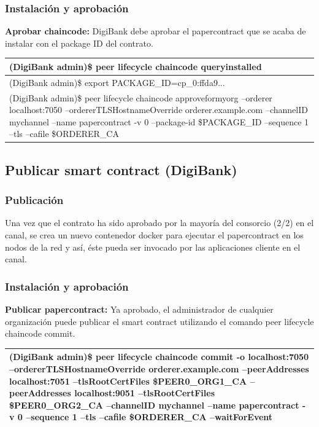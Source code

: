 \documentclass{beamer}
\begin{document}
	\begin{frame}
		\frametitle{Instalación y aprobación}
		\textbf{Aprobar chaincode:} DigiBank debe aprobar el papercontract que se acaba de instalar con el package ID del contrato.\\
		\begin{center}
			\begin{tabulary}{\linewidth}{L}
				\hline
				(DigiBank admin)\$ peer lifecycle chaincode queryinstalled \\
				\hline
				(DigiBank admin)\$ export PACKAGE\_ID=cp\_0:ffda9... \\
				\hline
				(DigiBank admin)\$ peer lifecycle chaincode approveformyorg --orderer localhost:7050 --ordererTLSHostnameOverride orderer.example.com --channelID mychannel --name papercontract -v 0 --package-id \$PACKAGE\_ID --sequence 1 --tls --cafile \$ORDERER\_CA \\
				\hline
			\end{tabulary} 
		\end{center}
	\end{frame}
	
	\subsection{Publicar smart contract (DigiBank)}
	
	\begin{frame}
		\frametitle{Publicación}
		Una vez que el contrato ha sido aprobado por la mayoría del consorcio (2/2) en el canal, se crea un nuevo contenedor docker para ejecutar el papercontract en los nodos de la red y así, éste pueda ser invocado por las aplicaciones cliente en el canal.
	\end{frame}

	\begin{frame}
		\frametitle{Instalación y aprobación}
		\textbf{Publicar papercontract:} Ya aprobado, el administrador de cualquier organización puede publicar el smart contract utilizando el comando peer lifecycle chaincode commit.\\
		\begin{center}
			\begin{tabulary}{\linewidth}{L}
				\hline
				(DigiBank admin)\$ peer lifecycle chaincode commit -o localhost:7050 --ordererTLSHostnameOverride orderer.example.com --peerAddresses localhost:7051 --tlsRootCertFiles \${PEER0\_ORG1\_CA} --peerAddresses localhost:9051 --tlsRootCertFiles \${PEER0\_ORG2\_CA} --channelID mychannel --name papercontract -v 0 --sequence 1 --tls --cafile \$ORDERER\_CA --waitForEvent\\
				\hline
			\end{tabulary} 
		\end{center}
	\end{frame}
	
\end{document}
